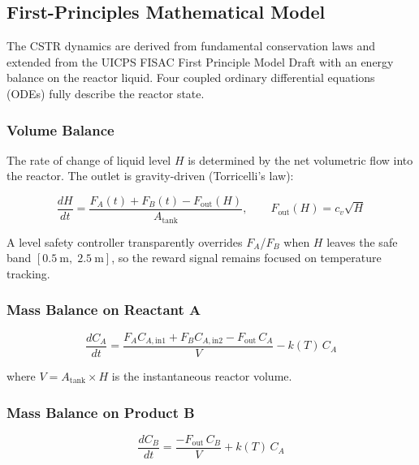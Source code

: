 \documentclass[12pt,a4paper]{article}
\begin{document}
\subsection{First-Principles Mathematical Model}

The CSTR dynamics are derived from fundamental conservation laws and extended
from the UICPS FISAC First Principle Model Draft with an energy balance on the
reactor liquid. Four coupled ordinary differential equations (ODEs) fully
describe the reactor state.

\subsubsection{Volume Balance}

The rate of change of liquid level $H$ is determined by the net volumetric
flow into the reactor. The outlet is gravity-driven (Torricelli's law):

\begin{equation}
  \frac{dH}{dt} = \frac{F_A(t) + F_B(t) - F_\mathrm{out}(H)}{A_\mathrm{tank}},
  \qquad F_\mathrm{out}(H) = c_v\sqrt{H}
  \label{eq:dH}
\end{equation}

A level safety controller transparently overrides $F_A$/$F_B$ when $H$ leaves
the safe band $[0.5\ \mathrm{m},\; 2.5\ \mathrm{m}]$, so the reward signal
remains focused on temperature tracking.

\subsubsection{Mass Balance on Reactant A}

\begin{equation}
  \frac{dC_A}{dt}
    = \frac{F_A C_{A,\mathrm{in1}} + F_B C_{A,\mathrm{in2}} - F_\mathrm{out}\,C_A}{V}
      - k(T)\,C_A
  \label{eq:dCA}
\end{equation}

where $V = A_\mathrm{tank}\times H$ is the instantaneous reactor volume.

\subsubsection{Mass Balance on Product B}

\begin{equation}
  \frac{dC_B}{dt} = \frac{-F_\mathrm{out}\,C_B}{V} + k(T)\,C_A
  \label{eq:dCB}
\end{equation}
\end{document}
